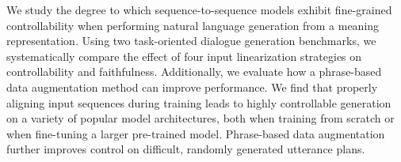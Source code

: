 We study the degree to which sequence-to-sequence models exhibit fine-grained
controllability when performing natural language generation from a meaning
representation.  Using two task-oriented dialogue generation benchmarks, we
systematically compare the effect of four input linearization strategies on
controllability and faithfulness.  Additionally, we evaluate how a
phrase-based data augmentation method can improve performance.  We find that
properly aligning input sequences during training leads to highly controllable
generation on a variety of popular model architectures, both when training
from scratch or when fine-tuning a larger pre-trained model.  Phrase-based
data augmentation further improves control on difficult, randomly generated
utterance plans.
